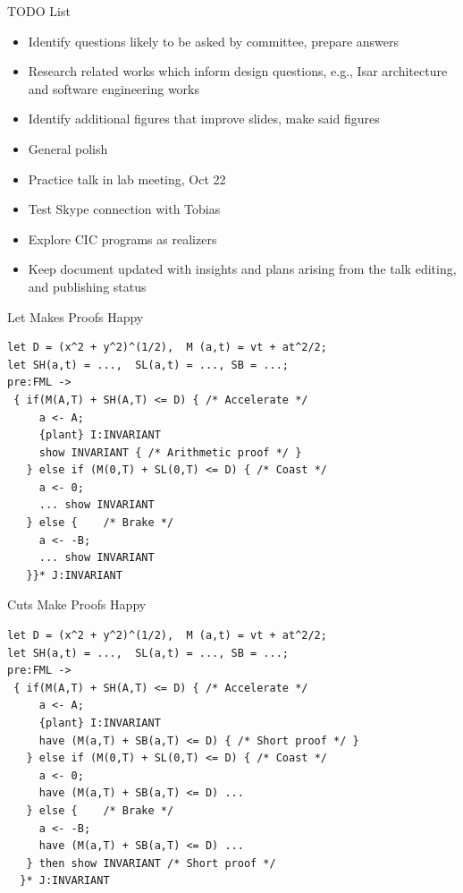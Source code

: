 \documentclass[slidestop,aspectratio=169]{beamer}
\theoremstyle{plain}
\theoremstyle{definition}
\theoremstyle{remark}
\begin{document}
\begin{frame}[t,allowframebreaks]{TODO List}
  \begin{itemize}
  \item Identify questions likely to be asked by committee, prepare answers
  \item Research related works which inform design questions, e.g., Isar architecture and software engineering works
  \item Identify additional figures that improve slides, make said figures
  \item General polish
  \item Practice talk in lab meeting, Oct 22
  \item Test Skype connection with Tobias
  \item Explore CIC programs as realizers
  \item Keep document updated with insights and plans arising from the talk editing, and publishing status
  \end{itemize}
\end{frame}

\begin{frame}[t,fragile]{Let Makes Proofs Happy}
\begin{verbatim}
let D = (x^2 + y^2)^(1/2),  M (a,t) = vt + at^2/2;
let SH(a,t) = ...,  SL(a,t) = ..., SB = ...;
pre:FML ->
 { if(M(A,T) + SH(A,T) <= D) { /* Accelerate */
     a <- A;
     {plant} I:INVARIANT
     show INVARIANT { /* Arithmetic proof */ }
   } else if (M(0,T) + SL(0,T) <= D) { /* Coast */
     a <- 0;
     ... show INVARIANT
   } else {    /* Brake */
     a <- -B;
     ... show INVARIANT
   }}* J:INVARIANT

\end{verbatim}
\end{frame}

\begin{frame}[t,fragile]{Cuts Make Proofs Happy}
\begin{verbatim}
let D = (x^2 + y^2)^(1/2),  M (a,t) = vt + at^2/2;
let SH(a,t) = ...,  SL(a,t) = ..., SB = ...;
pre:FML ->
 { if(M(A,T) + SH(A,T) <= D) { /* Accelerate */
     a <- A;
     {plant} I:INVARIANT
     have (M(a,T) + SB(a,T) <= D) { /* Short proof */ }
   } else if (M(0,T) + SL(0,T) <= D) { /* Coast */
     a <- 0;
     have (M(a,T) + SB(a,T) <= D) ...
   } else {    /* Brake */
     a <- -B;
     have (M(a,T) + SB(a,T) <= D) ...
   } then show INVARIANT /* Short proof */
  }* J:INVARIANT

\end{verbatim}
\end{frame}
\end{document}
